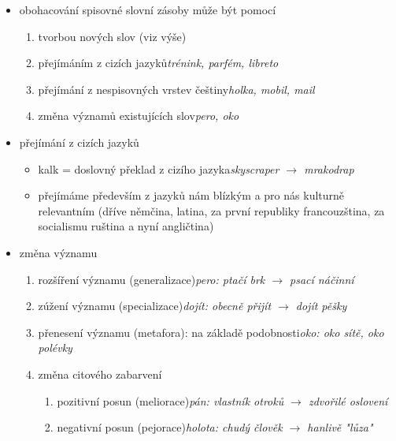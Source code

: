 \documentclass{memoir}
\begin{document}
 	\begin{itemize}
 		\item obohacování spisovné slovní zásoby může být pomocí
 		\begin{enumerate}
 			\item tvorbou nových slov (viz výše)
 			\item přejímáním z cizích jazyků\hfill\textit{trénink, parfém, libreto}
 			\item přejímání z nespisovných vrstev češtiny\hfill\textit{holka, mobil, mail}
 			\item změna významů existujících slov\hfill\textit{pero, oko}
 		\end{enumerate}
 		\item přejímání z cizích jazyků
 		\begin{itemize}
 			\item kalk = doslovný překlad z cizího jazyka\hfill\textit{skyscraper $\rightarrow$ mrakodrap}
 			\item přejímáme především z jazyků nám blízkým a pro nás kulturně relevantním (dříve němčina, latina, za první republiky francouzština, za socialismu ruština a nyní angličtina)
 		\end{itemize}
 		\item změna významu
 		\begin{enumerate}
 			\item rozšíření významu (generalizace)\hfill\textit{pero: ptačí brk $\rightarrow$ psací náčinní}
 			\item zúžení významu (specializace)\hfill\textit{dojít: obecně přijít $\rightarrow$ dojít pěšky}
 			\item přenesení významu (metafora): na základě podobnosti\hfill\textit{oko: oko sítě, oko polévky}
 			\item změna citového zabarvení
 			\begin{enumerate}
 				\item pozitivní posun (meliorace)\hfill\textit{pán: vlastník otroků $\rightarrow$ zdvořilé oslovení}
 				\item negativní posun (pejorace)\hfill\textit{holota: chudý člověk $\rightarrow$ hanlivě "lůza"}
 			\end{enumerate}
 		\end{enumerate}
 	\end{itemize}
\end{document}
